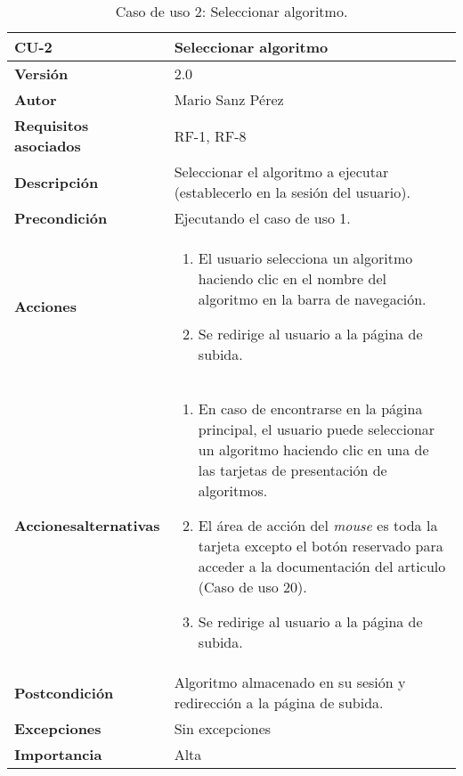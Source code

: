 \begin{table}[p]
	\centering
	\begin{tabularx}{\linewidth}{ p{} p{} }
		\toprule
		\textbf{CU-2}    & \textbf{Seleccionar algoritmo}\\
		\toprule
		\textbf{Versión}              & 2.0    \\
		\textbf{Autor}                & Mario Sanz Pérez \\
		\textbf{Requisitos asociados} & RF-1, RF-8 \\
		\textbf{Descripción}          & Seleccionar el algoritmo a ejecutar (establecerlo en la sesión del usuario). \\
		\textbf{Precondición}         & Ejecutando el caso de uso 1. \\
		\textbf{Acciones}             &
		\begin{enumerate}
			\def\labelenumi{\arabic{enumi}.}
			\tightlist
			\item El usuario selecciona un algoritmo haciendo clic en el nombre del algoritmo en la barra de navegación.
			\item Se redirige al usuario a la página de subida.
		\end{enumerate}\\
		\textbf{Acciones\newline alternativas}&
		\begin{enumerate}
			\def\labelenumi{\arabic{enumi}.}
			\tightlist
			\item En caso de encontrarse en la página principal, el usuario
			puede seleccionar un algoritmo haciendo clic en una de las tarjetas de
			presentación de algoritmos.
			\item El área de acción del \textit{mouse} es toda la tarjeta excepto el botón reservado para acceder a la documentación del articulo (Caso de uso 20).
			\item Se redirige al usuario a la página de subida. \end{enumerate}\\
		\textbf{Postcondición}        & Algoritmo almacenado en su sesión y redirección a la página de subida. \\
		\textbf{Excepciones}          & Sin excepciones \\
		\textbf{Importancia}          & Alta \\
		\bottomrule
	\end{tabularx}
	\caption[CU-02: Seleccionar un algoritmo]{Caso de uso 2: Seleccionar algoritmo.}
\end{table}

